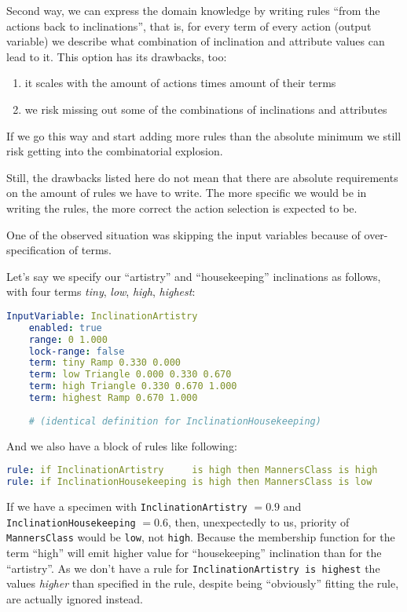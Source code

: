 \documentclass[12pt, a4paper]{report}
\begin{document}
	Second way, we can express the domain knowledge by writing rules ``from the actions back to inclinations'', that is, for every term of every action (output variable) we describe what combination of inclination and attribute values can lead to it.
	This option has its drawbacks, too:
	\begin{enumerate}
		\item it scales with the amount of actions times amount of their terms
		\item we risk missing out some of the combinations of inclinations and attributes
	\end{enumerate}
	If we go this way and start adding more rules than the absolute minimum we still risk getting into the combinatorial explosion.
	
	Still, the drawbacks listed here do not mean that there are absolute requirements on the amount of rules we have to write.
	The more specific we would be in writing the rules, the more correct the action selection is expected to be.

	One of the observed situation was skipping the input variables because of over-specification of terms.
	
	Let's say we specify our ``artistry'' and ``housekeeping'' inclinations as follows, with four terms \textit{tiny}, \textit{low}, \textit{high}, \textit{highest}:
	
	\begin{lstlisting}[language=yaml]
InputVariable: InclinationArtistry
	enabled: true
	range: 0 1.000
	lock-range: false
	term: tiny Ramp 0.330 0.000 
	term: low Triangle 0.000 0.330 0.670
	term: high Triangle 0.330 0.670 1.000
	term: highest Ramp 0.670 1.000
	
	# (identical definition for InclinationHousekeeping)
	\end{lstlisting}
	
	And we also have a block of rules like following:
	
	\begin{lstlisting}[language=yaml]
rule: if InclinationArtistry     is high then MannersClass is high
rule: if InclinationHousekeeping is high then MannersClass is low
	\end{lstlisting}
	
	If we have a specimen with \texttt{InclinationArtistry} $= 0.9$ and \texttt{InclinationHousekeeping} $= 0.6$,
	then, unexpectedly to us, priority of \texttt{MannersClass} would be \texttt{low}, not \texttt{high}.
	Because the membership function for the term ``high'' will emit higher value for ``housekeeping'' inclination than for the ``artistry''.
	As we don't have a rule for \texttt{InclinationArtistry is highest} the values \textit{higher} than specified in the rule, despite being ``obviously'' fitting the rule, are actually ignored instead.
	
\end{document}
